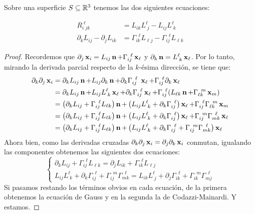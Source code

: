 \begin{prop}
Sobre una superficie $S\subseteq\mathbb{R}^3$ tenemos las dos siguientes ecuaciones:

\begin{align}
R_{i\; jk}^{\;\ell} &= L_{ik} L^{\ell}_{\; j} - L_{ij}L^{\ell}_{\; k} \tag{Gauss} \\
\partial_k L_{ij}-\partial_j L_{ik} &= \Gamma_{ik}^{\;\;\ell} L_{\ell j} - \Gamma_{ij}^{\;\;\ell} L_{\ell k} \tag{Codazzi-Mainardi}
\end{align}
\begin{proof}
Recordemos que $\partial_j\operatorname{\mathbf{x}}_i = L_{ij}\operatorname{\mathbf{n}} + \Gamma_{ij}^{\;\;\ell}\operatorname{\mathbf{x}}_\ell$ y $\partial_k\operatorname{\mathbf{n}} = L^{\ell}_{\; k}\operatorname{\mathbf{x}}_\ell$. Por lo tanto, mirando la derivada parcial respecto de la $k$-ésima dirección, se tiene que: \begin{align*}\partial_k\partial_j \operatorname{\mathbf{x}}_i &= \partial_k L_{ij}\operatorname{\mathbf{n}} + L_{ij}\partial_k\operatorname{\mathbf{n}} + \partial_k\Gamma_{ij}^{\;\;\ell} \; \operatorname{\mathbf{x}}_\ell + \Gamma_{ij}^{\;\;\ell}\partial_k\operatorname{\mathbf{x}}_\ell \\ &= \partial_k L_{ij} \operatorname{\mathbf{n}} + L_{ij}L^{\ell}_{\; k}\operatorname{\mathbf{x}}_\ell + \partial_k\Gamma_{ij}^{\;\; \ell}\operatorname{\mathbf{x}}_\ell + \Gamma_{ij}^{\;\;\ell}(L_{\ell k}\operatorname{\mathbf{n}} + \Gamma_{\ell k}^{\;\; m}\operatorname{\mathbf{x}}_m) \\ &= \left(\partial_k L_{ij} + \Gamma_{ij}^{\;\;\ell} L_{\ell k}\right)\operatorname{\mathbf{n}} + \left( L_{ij}L^\ell_{\; k}+\partial_k\Gamma_{ij}^{\;\;\ell}\right)\operatorname{\mathbf{x}}_\ell + \Gamma_{ij}^{\;\;\ell}\Gamma_{\ell k}^{\;\; m}\operatorname{\mathbf{x}}_m\\ &= \left(\partial_k L_{ij} + \Gamma_{ij}^{\;\;\ell} L_{\ell k}\right)\operatorname{\mathbf{n}} + \left( L_{ij}L^\ell_{\; k}+\partial_k\Gamma_{ij}^{\;\;\ell}\right)\operatorname{\mathbf{x}}_\ell + \Gamma_{ij}^{\;\; m}\Gamma_{m k}^{\;\; \ell}\operatorname{\mathbf{x}}_\ell \\ &= \left(\partial_k L_{ij} + \Gamma_{ij}^{\;\;\ell} L_{\ell k}\right)\operatorname{\mathbf{n}} + \left( L_{ij}L^\ell_{\; k}+\partial_k\Gamma_{ij}^{\;\;\ell} + \Gamma_{ij}^{\;\; m}\Gamma_{mk}^{\;\;\ell}\right)\operatorname{\mathbf{x}}_\ell\end{align*} Ahora bien, como las derivadas cruzadas $\partial_k\partial_j\operatorname{\mathbf{x}}_i = \partial_j\partial_k\operatorname{\mathbf{x}}_i$ conmutan, igualando las componentes obtenemos las siguientes dos ecuaciones:
$$\begin{cases} \partial_k L_{ij} + \Gamma_{ij}^{\;\;\ell}L_{\ell k} = \partial_j L_{ik} + \Gamma_{ik}^{\;\;\ell}L_{\ell j}\\   L_{ij}L^\ell_{\; k}+\partial_k\Gamma_{ij}^{\;\;\ell} + \Gamma_{ij}^{\;\; m}\Gamma_{mk}^{\;\;\ell}= L_{ik}L^\ell_{\; j}+\partial_j\Gamma_{ik}^{\;\;\ell} + \Gamma_{ik}^{\;\; m}\Gamma_{mj}^{\;\;\ell}\end{cases}$$ Si pasamos restando los términos obvios en cada ecuación, de la primera obtenemos la ecuación de Gauss y en la segunda la de Codazzi-Mainardi. Y estamos.
\end{proof}
\end{prop}

